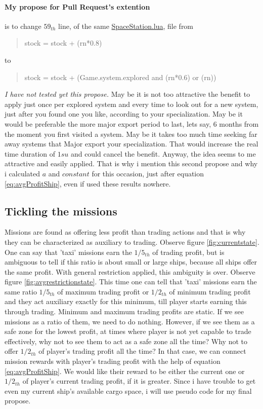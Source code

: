 \documentclass[]{article}
\begin{document}
\paragraph{My propose for Pull Request's extention} is to change $59_{th}$ line,  of the same \hyperref{https://github.com/pioneerspacesim/pioneer/blob/25bc005c67a43eb2c17fcb83fe20f5d07a6b394c/data/libs/SpaceStation.lua#L59}{}{}{SpaceStation.lua}, file from
\begin{quote}
	stock = stock + (rn*0.8)
\end{quote}
to
\begin{quote}
	stock = stock + (Game.system.explored and (rn*0.6) or (rn))
\end{quote}
\emph{I have not tested yet this propose.} May be it is not too attractive the benefit to apply just once per explored system and every time to look out for a new system, just after you found one you like, according to your specialization. May be it would be preferable the more major export period to last, lets say, 6 months from the moment you first visited a system. May be it takes too much time seeking far away systems that Major export your specialization. That would increase the real time duration of $1su$ and could cancel the benefit. Anyway, the idea seems to me attractive and easily applied. That is why i mention this second propose and why i calculated $a$ and $constant$ for this occasion, just after equation \eqref{eq:avgProfitShip}, even if used these results nowhere. 

\subsection{Tickling the missions}
Missions are found as offering less profit than trading actions and that is why they can be characterized as auxiliary to trading. Observe figure \ref{fig:currentstate}. One can say that 'taxi' missions earn the $1/5_{th}$ of trading profit, but is ambiguous to tell if this ratio is about small or large ships, because all ships offer the same profit. With general restriction applied, this ambiguity is over. Observe figure \ref{fig:avgrestrictionstate}. This time one can tell that 'taxi' missions earn the same ratio $1/5_{th}$ of maximum trading profit or $1/2_{th}$ of minimum trading profit and they act auxiliary exactly for this minimum, till player starts earning this through trading. Minimum and maximum trading profits are static. If we see missions as a ratio of them, we need to do nothing. However, if we see them as a safe zone for the lowest profit, at times where player is not yet capable to trade effectively, why not to see them to act as a safe zone all the time? Why not to offer  $1/2_{th}$ of player's trading profit all the time? In that case, we can connect mission rewards with player's trading profit with the help of equation \eqref{eq:avgProfitShip}. We would like their reward to be either the current one or $1/2_{th}$ of player's current trading profit, if it is greater. Since i have trouble to get even my current ship's available cargo space, i will use pseudo code for my final propose. 
\end{document}

